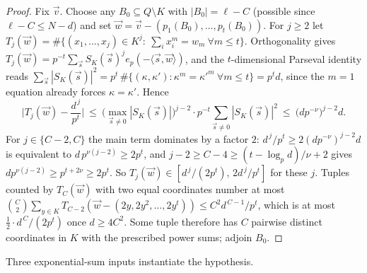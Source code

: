 \documentclass[11pt]{article}
\theoremstyle{definition}
\begin{document}
\begin{proof}
Fix $\vec v$.  Choose any $B_0\subseteq Q\setminus K$ with $|B_0|=\ell-C$ (possible since $\ell-C\le N-d$) and set $\vec w=\vec v-(p_1(B_0),\dots,p_t(B_0))$.  For $j\ge2$ let $T_j(\vec w)=\#\{(x_1,\dots,x_j)\in K^j:\ \sum_ix_i^m=w_m\ \forall m\le t\}$.  Orthogonality gives $T_j(\vec w)=p^{-t}\sum_{\vec s}S_K(\vec s)^je_p(-\langle\vec s,\vec w\rangle)$, and the $t$-dimensional Parseval identity reads $\sum_{\vec s}|S_K(\vec s)|^2=p^t\,\#\{(\kappa,\kappa'):\kappa^m=\kappa'^m\ \forall m\le t\}=p^td$, since the $m=1$ equation already forces $\kappa=\kappa'$.  Hence
\[
        \Big|T_j(\vec w)-\frac{d^{\,j}}{p^{t}}\Big|
        \ \le\ \big(\max_{\vec s\ne0}|S_K(\vec s)|\big)^{j-2}\cdot p^{-t}\sum_{\vec s\ne0}|S_K(\vec s)|^{2}
        \ \le\ \big(dp^{-\nu}\big)^{j-2}d .
\]
For $j\in\{C-2,C\}$ the main term dominates by a factor $2$: $d^{\,j}/p^t\ge2(dp^{-\nu})^{j-2}d$ is equivalent to $d\,p^{\nu(j-2)}\ge2p^{t}$, and $j-2\ge C-4\ge(t-\log_pd)/\nu+2$ gives $dp^{\nu(j-2)}\ge p^{t+2\nu}\ge2p^t$.  So $T_j(\vec w)\in[d^{\,j}/(2p^t),\,2d^{\,j}/p^t]$ for these $j$.  Tuples counted by $T_C(\vec w)$ with two equal coordinates number at most $\binom C2\sum_{y\in K}T_{C-2}(\vec w-(2y,2y^2,\dots,2y^t))\le C^2d^{\,C-1}/p^t$, which is at most $\tfrac12\cdot d^{\,C}/(2p^t)$ once $d\ge4C^2$.  Some tuple therefore has $C$ pairwise distinct coordinates in $K$ with the prescribed power sums; adjoin $B_0$.
\end{proof}

Three exponential-sum inputs instantiate the hypothesis.
\end{document}
